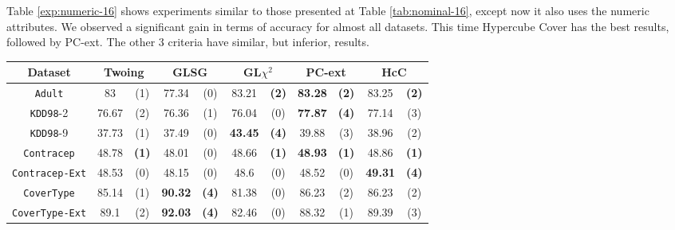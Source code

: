 Table \ref{exp:numeric-16} shows experiments  similar to those presented at Table \ref{tab:nominal-16}, except now it also uses the numeric attributes. We observed a significant gain in terms of accuracy for almost all datasets. This time Hypercube Cover has the best results, followed by PC-ext. The other 3 criteria have similar, but inferior, results.

\begin{table}
\small
\centering
\begin{tabular}{c|cc|cc|cc|cc|cc} 
Dataset              &        \multicolumn{2}{c|}{Twoing} &   \multicolumn{2}{c|}{GLSG} &   \multicolumn{2}{c|}{GL$\chi^2$} & \multicolumn{2}{c|}{PC-ext}  & \multicolumn{2}{c}{HcC}  \\
\hline   
{\tt Adult}          &  83            &  (1)              &  77.34      &  (0)          &  83.21       &  {\bf (2)}         & {\bf 83.28} & {\bf (2)}      & 83.25        & {\bf (2)} \\
{\tt KDD98}-2        &  76.67         &  (2)              &  76.36      &  (1)          &  76.04       &  (0)               & {\bf 77.87} & {\bf (4)}      & 77.14        & (3)       \\
{\tt KDD98}-9        &  37.73         &  (1)              &  37.49      &  (0)          &  {\bf 43.45} &  {\bf (4)}         &  39.88      & (3)            & 38.96        & (2)       \\
{\tt Contracep}      &  48.78         &  {\bf (1)}        &  48.01      &  (0)          &  48.66       &  {\bf (1)}         & {\bf 48.93} & {\bf (1)}      & 48.86        & {\bf (1)} \\
{\tt Contracep-Ext}  &  48.53         &  (0)              &  48.15      &  (0)          &  48.6        &  (0)               &  48.52      & (0)            & {\bf 49.31 } & {\bf (4)} \\
{\tt CoverType}      &  85.14         &  (1)              &  {\bf 90.32}&  {\bf (4)}    &  81.38       &  (0)               &  86.23      & (2)            & 86.23        & (2)       \\
{\tt CoverType-Ext}  &  89.1          &  (2)              &  {\bf 92.03}&  {\bf (4)}    &  82.46       &  (0)               &  88.32      & (1)            & 89.39        & (3)       \\

\end{tabular}
\end{table}
